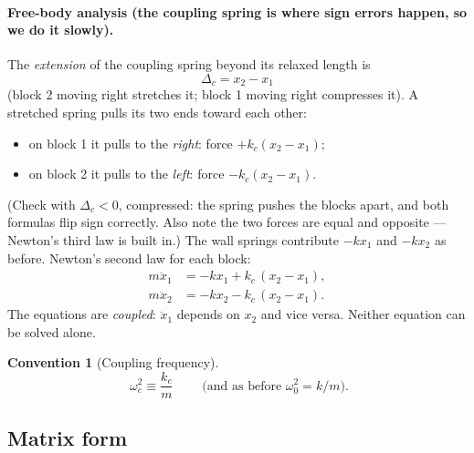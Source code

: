\documentclass[11pt]{article}
\theoremstyle{plain}
\theoremstyle{definition}
\newtheorem{convention}[lemma]{Convention}
\theoremstyle{remark}
\begin{document}
\paragraph{Free-body analysis (the coupling spring is where sign errors
happen, so we do it slowly).}
The \emph{extension} of the coupling spring beyond its relaxed length is
\begin{equation}
  \Delta_c = x_2 - x_1
\end{equation}
(block 2 moving right stretches it; block 1 moving right compresses it). A
stretched spring pulls its two ends toward each other:
\begin{itemize}
  \item on block 1 it pulls to the \emph{right}: force $+k_c(x_2-x_1)$;
  \item on block 2 it pulls to the \emph{left}: force $-k_c(x_2-x_1)$.
\end{itemize}
(Check with $\Delta_c<0$, compressed: the spring pushes the blocks apart, and
both formulas flip sign correctly. Also note the two forces are equal and
opposite --- Newton's third law is built in.) The wall springs contribute
$-kx_1$ and $-kx_2$ as before. Newton's second law for each block:
\begin{equation}
  \boxed{\;
  \begin{aligned}
    m\ddot x_1 &= -k x_1 + k_c\,(x_2 - x_1), \\
    m\ddot x_2 &= -k x_2 - k_c\,(x_2 - x_1).
  \end{aligned}
  \;}
  \label{eq:coupled-newton}
\end{equation}
The equations are \emph{coupled}: $\ddot x_1$ depends on $x_2$ and vice
versa. Neither equation can be solved alone.

\begin{convention}[Coupling frequency]
\begin{equation}
  \boxed{\;\omega_c^2 \equiv \frac{k_c}{m}\;}
  \qquad
  \text{(and as before } \omega_0^2 = k/m\text{)}.
\end{equation}
\end{convention}

\subsection{Matrix form}
\end{document}
